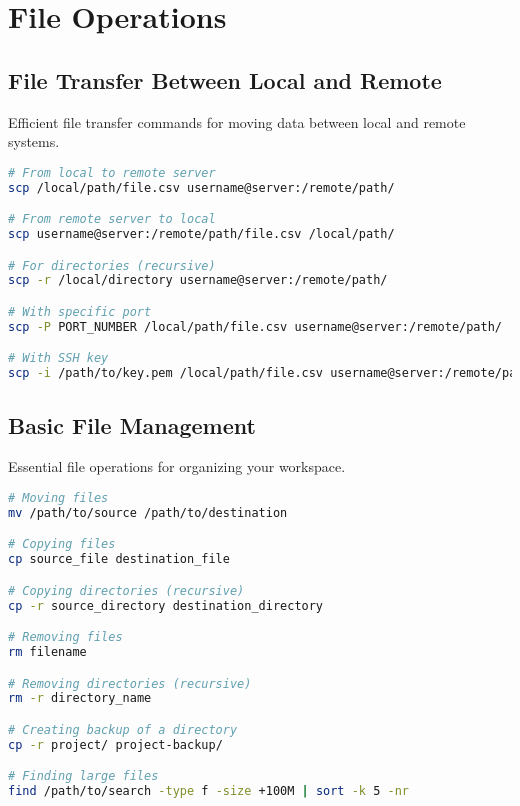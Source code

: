 \documentclass{article}
\begin{document}
\section{File Operations}

\subsection{File Transfer Between Local and Remote}
Efficient file transfer commands for moving data between local and remote systems.

\begin{tcolorbox}[colback=green!5!white, colframe=green!75!black, title=File Transfer with SCP]
\begin{lstlisting}[language=bash]
# From local to remote server
scp /local/path/file.csv username@server:/remote/path/

# From remote server to local
scp username@server:/remote/path/file.csv /local/path/

# For directories (recursive)
scp -r /local/directory username@server:/remote/path/

# With specific port
scp -P PORT_NUMBER /local/path/file.csv username@server:/remote/path/

# With SSH key
scp -i /path/to/key.pem /local/path/file.csv username@server:/remote/path/
\end{lstlisting}
\end{tcolorbox}

\subsection{Basic File Management}
Essential file operations for organizing your workspace.

\begin{tcolorbox}[colback=green!5!white, colframe=green!75!black, title=File Management Commands]
\begin{lstlisting}[language=bash]
# Moving files
mv /path/to/source /path/to/destination

# Copying files
cp source_file destination_file

# Copying directories (recursive)
cp -r source_directory destination_directory

# Removing files
rm filename

# Removing directories (recursive)
rm -r directory_name

# Creating backup of a directory
cp -r project/ project-backup/

# Finding large files
find /path/to/search -type f -size +100M | sort -k 5 -nr
\end{lstlisting}
\end{tcolorbox}
\end{document}
